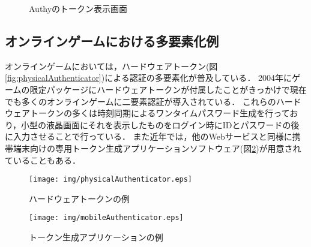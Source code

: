 \begin{figure}[ht]
\begin{center}
\end{center}
\caption{Authyのトークン表示画面}
\label{fig:authyiPhone}
\end{figure}

\subsection{オンラインゲームにおける多要素化例}
オンラインゲームにおいては，ハードウェアトークン(図\ref{fig:physicalAuthenticator})による認証の多要素化が普及している\cite{DBLP:journals/corr/CristofaroDFN13}．
2004年にゲームの限定パッケージにハードウェアトークンが付属した\cite{Yamane:2011:SOG:2021672.2021743}ことがきっかけで現在でも多くのオンラインゲームに二要素認証が導入されている．
これらのハードウェアトークンの多くは時刻同期によるワンタイムパスワード生成を行っており，小型の液晶画面にそれを表示したものをログイン時にIDとパスワードの後に入力させることで行っている．
また近年では，他のWebサービスと同様に携帯端末向けの専用トークン生成アプリケーションソフトウェア(図\ref{fig:mobileAuthenticator})が用意されていることもある．

\begin{figure}[ht]

\begin{minipage}{0.5\hsize}
\begin{center}
\texttt{[image: img/physicalAuthenticator.eps]}
\end{center}
\caption{ハードウェアトークンの例}
\label{fig:physicalAuthenticator}
\end{minipage}
\begin{minipage}{0.5\hsize}
\begin{center}
\texttt{[image: img/mobileAuthenticator.eps]}
\end{center}
\caption{トークン生成アプリケーションの例}
\label{fig:mobileAuthenticator}
\end{minipage}

\end{figure}


\newpage
